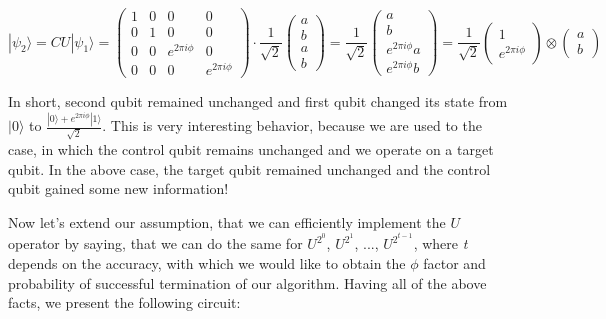 \[ |\psi_2\rangle = CU|\psi_1\rangle = \begin{pmatrix} 
1 & 0 & 0 & 0 \\
0 & 1 & 0 & 0 \\
0 & 0 & e^{2 \pi i \phi} & 0 \\
0 & 0 & 0 & e^{2 \pi i \phi}
\end{pmatrix} \cdot \frac{1}{\sqrt{2}} \begin{pmatrix} a \\ b \\ a \\ b \end{pmatrix} = \frac{1}{\sqrt{2}} \begin{pmatrix}
a \\ b \\ e^{2 \pi i \phi} a \\ e^{2 \pi i \phi} b \end{pmatrix} = \frac{1}{\sqrt{2}} \begin{pmatrix} 1 \\ e^{2 \pi i \phi}\end{pmatrix} \otimes \begin{pmatrix} a \\ b \end{pmatrix} \]

In short, second qubit remained unchanged and first qubit changed its state from $|0\rangle$ to $\frac{|0\rangle + e^{2 \pi i \phi}|1\rangle}{\sqrt{2}}$. This is very interesting behavior, because we are used to the case, in which the control qubit remains unchanged and we operate on a target qubit. In the above case, the target qubit remained unchanged and the control qubit gained some new information!

Now let's extend our assumption, that we can efficiently implement the $U$ operator by saying, that we can do the same for $U^{2^{0}}$, $U^{2^{1}}$, ..., $U^{2^{t - 1}}$, where \textit{t} depends on the accuracy, with which we would like to obtain the $\phi$ factor and probability of successful termination of our algorithm. Having all of the above facts, we present the following circuit:

\[\]


